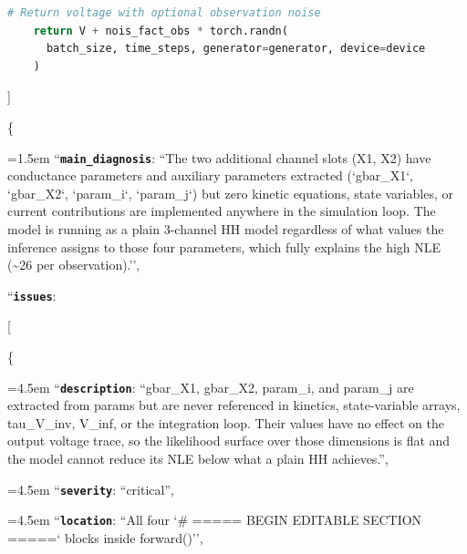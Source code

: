 \begin{tcolorbox}
\begin{lstlisting}[language=Python,style=pythonstyle]
    # Return voltage with optional observation noise
    return V + nois_fact_obs * torch.randn(
      batch_size, time_steps, generator=generator, device=device
    )
\end{lstlisting}
\smallskip
\par\noindent [[ \#\# feedback \#\# ]]\\
\noindent
\par\noindent \{
\par\noindent\hangindent=1.5em \hspace*{1.5em}``\textbf{\texttt{main\_diagnosis}}\textquotesingle\textquotesingle: ``The two additional channel slots (X1, X2) have conductance parameters and auxiliary parameters extracted (`gbar\_X1`, `gbar\_X2`, `param\_i`, `param\_j`) but zero kinetic equations, state variables, or current contributions are implemented anywhere in the simulation loop. The model is running as a plain 3-channel HH model regardless of what values the inference assigns to those four parameters, which fully explains the high NLE (\textasciitilde{}26 per observation).'',
\par\noindent \hspace*{1.5em}``\textbf{\texttt{issues}}\textquotesingle\textquotesingle:
\par\noindent \hspace*{1.5em}[
\par\noindent \hspace*{3.0em}\{
\par\noindent\hangindent=4.5em \hspace*{3.0em}\hspace*{1.5em}``\textbf{\texttt{description}}\textquotesingle\textquotesingle: ``gbar\_X1, gbar\_X2, param\_i, and param\_j are extracted from params but are never referenced in kinetics, state-variable arrays, tau\_V\_inv, V\_inf, or the integration loop. Their values have no effect on the output voltage trace, so the likelihood surface over those dimensions is flat and the model cannot reduce its NLE below what a plain HH achieves.'',
\par\noindent\hangindent=4.5em \hspace*{3.0em}\hspace*{1.5em}``\textbf{\texttt{severity}}\textquotesingle\textquotesingle: ``critical'',
\par\noindent\hangindent=4.5em \hspace*{3.0em}\hspace*{1.5em}``\textbf{\texttt{location}}\textquotesingle\textquotesingle: ``All four `\# ===== BEGIN EDITABLE SECTION =====` blocks inside forward()'',

\end{tcolorbox}
